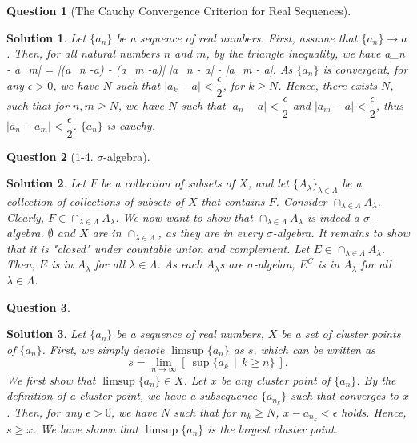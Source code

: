 \documentclass{article} %
\def\eQb#1\eQe{\begin{eqnarray*}#1\end{eqnarray*}}
\theoremstyle{quest}
\newtheorem*{question}{Question}
\newtheorem*{solution}{Solution}
\begin{document}
\bigskip

\begin{question}[The Cauchy Convergence Criterion for Real Sequences]
\end{question}
\begin{solution}
Let $\{ a_n \}$ be a sequence of real numbers. First, assume that $\{ a_n \} \to a$.
Then, for all natural numbers $n$ and $m$, by the triangle inequality, we have
\eQb
|a_n - a_m| = |(a_n -a) - (a_m -a)| \leq |a_n - a| - |a_m - a|.
\eQe
As $\{ a_n \}$ is convergent, for any $\epsilon > 0$, we have $N$ such that
$|a_k - a| < \dfrac{\epsilon}{2}$, for $k \geq N$. Hence, there exists $N$, such that
for $n,m \geq N$, we have $N$ such that $|a_n - a| < \dfrac{\epsilon}{2}$ 
and $|a_m - a| < \dfrac{\epsilon}{2}$, thus $|a_n - a_m| < \dfrac{\epsilon}{2}$. $\{ a_n \}$
is cauchy.
\end{solution}

\pagebreak

\begin{question}[1-4. $\sigma$-algebra]
\end{question}
\begin{solution}
Let $F$ be a collection of subsets of $X$, and let
$\{ A_{\lambda} \}_{\lambda \in \Lambda}$ be 
a collection of collections of subsets of $X$ that contains
$F$. Consider $\cap_{\lambda \in \Lambda} A_{\lambda}$. Clearly, $F \in 
\cap_{\lambda \in \Lambda} A_{\lambda}$. We now want to show that $\cap_{\lambda \in \Lambda}
A_{\lambda}$ is indeed a $\sigma$-algebra. $\emptyset$ and $X$ are in 
$\cap_{\lambda \in \Lambda}$, as they are in every $\sigma$-algebra. It remains to show that
it is "closed" under countable union and complement. Let $E \in \cap_{\lambda \in \Lambda} A_{\lambda}$.
Then, $E$ is in $A_{\lambda}$ for all $\lambda \in \Lambda$. As each $A_{\lambda}$s are $\sigma$-algebra,
$E^{C}$ is in $A_{\lambda}$ for all $\lambda \in \Lambda$.

\end{solution}


\begin{question}
\end{question}
\begin{solution}
Let $\{ a_n \}$ be a sequence of
real numbers, $X$ be a set of cluster points of $\{ a_n \}$. 
First, 
we simply denote $\limsup \{ a_n \}$ as $s$, which can be written as
\[
s = 
\underset{n \to \infty}{\lim} [ \> \sup \{ a_k \>\> | \>\> k \geq n \} \> ].
\]
We first show that $\limsup \{ a_n \} \in X$.
Let $x$ be any cluster point of $\{ a_n \}$. By the definition of a cluster point,
we have a subsequence $\{ a_{n_k} \} $ such that converges to $x$. Then, for any $\epsilon > 0$,
we have $N$ such that for $n_k \geq N$, $x - a_{n_k} < \epsilon$ holds. Hence, $s \geq x$. We have
shown that $\limsup \{ a_n \}$ is the largest cluster point.
\end{solution}
\end{document}
